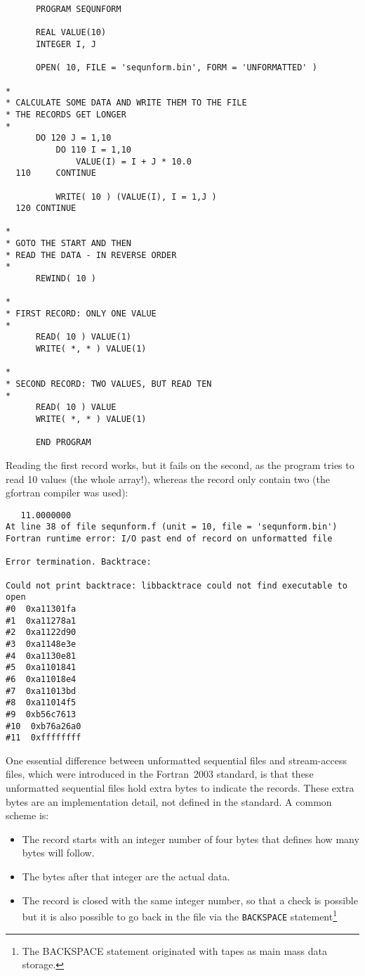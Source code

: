 \begin{verbatim}
      PROGRAM SEQUNFORM

      REAL VALUE(10)
      INTEGER I, J

      OPEN( 10, FILE = 'sequnform.bin', FORM = 'UNFORMATTED' )

*
* CALCULATE SOME DATA AND WRITE THEM TO THE FILE
* THE RECORDS GET LONGER
*
      DO 120 J = 1,10
          DO 110 I = 1,10
              VALUE(I) = I + J * 10.0
  110     CONTINUE

          WRITE( 10 ) (VALUE(I), I = 1,J )
  120 CONTINUE

*
* GOTO THE START AND THEN
* READ THE DATA - IN REVERSE ORDER
*
      REWIND( 10 )

*
* FIRST RECORD: ONLY ONE VALUE
*
      READ( 10 ) VALUE(1)
      WRITE( *, * ) VALUE(1)

*
* SECOND RECORD: TWO VALUES, BUT READ TEN
*
      READ( 10 ) VALUE
      WRITE( *, * ) VALUE(1)

      END PROGRAM
\end{verbatim}

Reading the first record works, but it fails on the second, as the program
tries to read 10 values (the whole array!), whereas the record only contain two
(the gfortran compiler was used):

\begin{verbatim}
   11.0000000
At line 38 of file sequnform.f (unit = 10, file = 'sequnform.bin')
Fortran runtime error: I/O past end of record on unformatted file

Error termination. Backtrace:

Could not print backtrace: libbacktrace could not find executable to open
#0  0xa11301fa
#1  0xa11278a1
#2  0xa1122d90
#3  0xa1148e3e
#4  0xa1130e81
#5  0xa1101841
#6  0xa11018e4
#7  0xa11013bd
#8  0xa11014f5
#9  0xb56c7613
#10  0xb76a26a0
#11  0xffffffff
\end{verbatim}

One essential difference between unformatted sequential files and stream-access files,
which were introduced in the Fortran~2003 standard, is that these unformatted sequential files
hold extra bytes to indicate the records. These extra bytes are an implementation detail,
not defined in the standard. A common scheme is:
\begin{itemize}
\item
The record starts with an integer number of four bytes that defines how many bytes
will follow.
\item
The bytes after that integer are the actual data.
\item
The record is closed with the same integer number, so that a check is possible but it
is also possible to go back in the file via the \verb+BACKSPACE+ statement\footnote{The
BACKSPACE statement originated with tapes as main mass data storage.}
\end{itemize}


